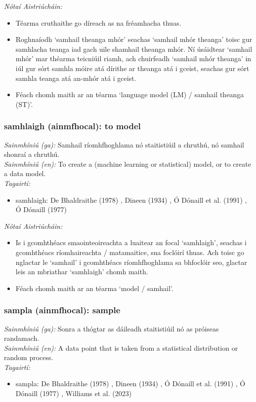  \noindent \textit{Nótaí Aistriúcháin:}
\begin{itemize}
	\item Téarma cruthaithe go díreach as na fréamhacha thuas.
	\item Roghnaíodh `samhail theanga mhór' seachas `samhail mhór theanga' toisc gur samhlacha teanga iad gach uile shamhail theanga mhór. Ní úsáidtear `samhail mhór' mar théarma teicniúil riamh, ach chuirfeadh `samhail mhór theanga' in iúl gur sórt samhla móire atá dírithe ar theanga atá i gceist, seachas gur sórt samhla teanga atá an-mhór atá i gceist.
	\item Féach chomh maith ar an téarma `language model (LM) / samhail theanga (ST)'.
\end{itemize}


\subsubsection*{samhlaigh (ainmfhocal): to model}
 \noindent \textit{Sainmhíniú (ga):} Samhail ríomhfhoghlama nó staitistiúil a chruthú, nó samhail shonraí a chruthú.
\\
 \noindent \textit{Sainmhíniú (en):} To create a (machine learning or statistical) model, or to create a data model.
\\
 \noindent \textit{Tagairtí:}
\begin{itemize}
	\item samhlaigh: De Bhaldraithe (1978) \cite{de-bhaldraithe}, Dineen (1934) \cite{dineen}, Ó Dónaill et al. (1991) \cite{focloir-beag}, Ó Dónaill (1977) \cite{odonaill}
\end{itemize}

 \noindent \textit{Nótaí Aistriúcháin:}
\begin{itemize}
	\item Is i gcomhthéacs smaointeoireachta a luaitear an focal `samhlaigh', seachas i gcomhthéacs ríomhaireachta / matamaitice, sna foclóirí thuas. Ach toisc go nglactar le `samhail' i gcomhthéacs ríomhfhoghlama sa bhfoclóir seo, glactar leis an mbriathar `samhlaigh' chomh maith.
	\item Féach chomh maith ar an téarma `model / samhail'.
\end{itemize}


\subsubsection*{sampla (ainmfhocal): sample}
 \noindent \textit{Sainmhíniú (ga):} Sonra a thógtar as dáileadh staitistiúil nó as próiseas randamach.
\\
 \noindent \textit{Sainmhíniú (en):} A data point that is taken from a statistical distribution or random process.
\\
 \noindent \textit{Tagairtí:}
\begin{itemize}
	\item sampla: De Bhaldraithe (1978) \cite{de-bhaldraithe}, Dineen (1934) \cite{dineen}, Ó Dónaill et al. (1991) \cite{focloir-beag}, Ó Dónaill (1977) \cite{odonaill}, Williams et al. (2023) \cite{storchiste}
\end{itemize}

